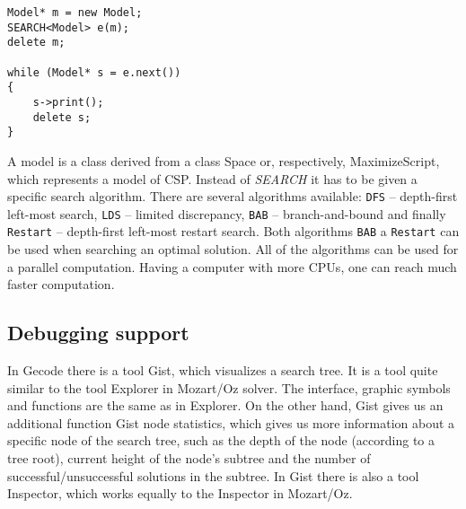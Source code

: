\begin{verbatim}
Model* m = new Model;	
SEARCH<Model> e(m);
delete m;

while (Model* s = e.next())
{
	s->print();
	delete s;
}  
\end{verbatim}

A model is a class derived from a class Space or, respectively, MaximizeScript, which
represents a model of CSP. Instead of {\em SEARCH} it has to be given a specific search
algorithm. There are several algorithms available: \texttt{DFS} -- depth-first left-most search, \texttt{LDS} -- limited discrepancy,
\texttt{BAB} -- branch-and-bound and finally \texttt{Restart} -- depth-first left-most
restart search. Both algorithms \texttt{BAB} a \texttt{Restart} can be used when 
searching an optimal solution. All of the algorithms can be used for a parallel computation.
Having a computer with more CPUs, one can reach much faster computation.

\subsection{Debugging support}
In Gecode there is a tool Gist, which visualizes a search tree. It is a tool quite 
similar to the tool Explorer in Mozart/Oz solver. The interface, graphic symbols and
functions are the same as in Explorer. On the other hand, Gist gives us an additional 
function Gist node statistics, which gives us more information about a specific node 
of the search tree, such as the depth of the node (according to a tree root), current height
of the node's subtree and the number of successful/unsuccessful solutions in the subtree.
In Gist there is also a tool Inspector, which works equally to the Inspector in Mozart/Oz.


